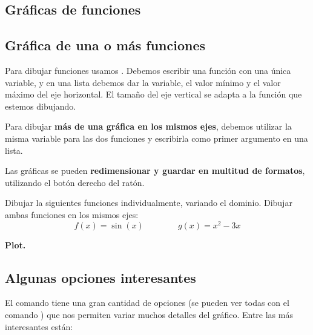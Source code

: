 \documentclass[a4paper,10pt, draft]{article}
\newcommand{\com}[1]{\textbf{\color{blue}{#1}}}
\newenvironment{capitulo}{\begin{tcolorbox}[colback=red!5!white,colframe=red!75!black]}{\end{tcolorbox}\bigskip}
\newenvironment{ejer}{\begin{tcolorbox}[center title, title=Ejercicios,
fonttitle=\sffamily\bfseries,colback=blue!5,colframe=orange]}{\end{tcolorbox}}
\newenvironment{funciones}{\begin{tcolorbox}[center title, title=Nuevas funciones, fonttitle=\sffamily\bfseries, colback=green!5!white,colframe=red!75!black]}{\end{tcolorbox}\bigskip}
\begin{document}
\newpage


\begin{capitulo}

\section{Gráficas de funciones}

\end{capitulo}

\subsection{Gráfica de una o más funciones}

Para  dibujar funciones usamos \com {Plot[f[x],\{x,min,max\}]}. Debemos escribir una función con una única variable, y en una lista debemos dar la variable, el valor mínimo y el valor máximo del eje horizontal.  El tamaño del eje vertical se adapta a la función que estemos dibujando.

Para dibujar \textbf{más de una gráfica en los mismos ejes}, debemos utilizar la misma variable para las dos funciones y escribirla como primer argumento en una lista.

Las gráficas se pueden \textbf{redimensionar y guardar en  multitud de formatos}, utilizando el botón derecho del ratón.

\begin{ejer}

Dibujar la siguientes funciones individualmente, variando el dominio. Dibujar ambas funciones en los mismos ejes:
$$
f(x)=\sin(x) \qquad \qquad g(x)=x^2-3x
$$

\end{ejer} 


\begin{funciones}

\textbf{Plot.}


\end{funciones}


 \newpage

\subsection{Algunas opciones interesantes}


El comando \com{Plot} tiene una gran cantidad de opciones (se pueden ver todas con el comando \com{Options[f]}) que nos permiten variar muchos detalles del gráfico. Entre las más interesantes están:
\end{document}
